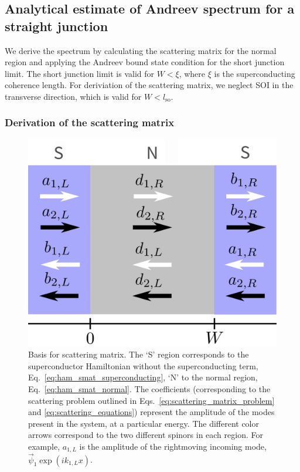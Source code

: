 	\subsection{Analytical estimate of Andreev spectrum for a straight junction}
		
		We derive the spectrum by calculating the scattering matrix for the normal region and applying the Andreev bound state condition for the short junction limit\cite{beenakker_universal_1991,sticlet_robustness_2017}.
		The short junction limit is valid for $W<\xi$, where $\xi$ is the superconducting coherence length.
		For deriviation of the scattering matrix, we neglect SOI in the transverse direction, which is valid for $W<l_\text{so}$.

		\subsubsection{Derivation of the scattering matrix}

			\begin{figure}[!htb]
			\centering
			\includegraphics[width=0.75\columnwidth]{images/scattering}
			\caption{Basis for scattering matrix. 
			The `S' region corresponds to the superconductor Hamiltonian without the superconducting term, Eq.~\eqref{eq:ham_smat_superconducting}, `N' to the normal region, Eq.~\eqref{eq:ham_smat_normal}. 
			The coefficients (corresponding to the scattering problem outlined in Eqs.~\eqref{eq:scattering_matrix_problem} and \eqref{eq:scattering_equations}) represent the amplitude of the modes present in the system, at a particular energy.
			The different color arrows correspond to the two different spinors in each region.
			For example, $a_{1,L}$ is the amplitude of the rightmoving incoming mode, $\vec{\psi}_1 \exp\left(i k_{1,L} x\right)$.}
			\label{fig:scattering}
			\end{figure}
			
